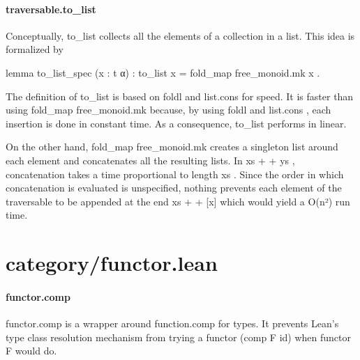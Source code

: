 \documentclass{article}
\begin{document}
\paragraph{traversable.to\_list}
\par
Conceptually, 
\colorbox[RGB]{253,246,227}{{{{\color[RGB]{101, 123, 131} to\_list }}}} collects all the elements of a collection
in a list. This idea is formalized by
\par
\colorbox[RGB]{253,246,227}{{{{\color[RGB]{133, 153, 0} lemma }}}{{{\color[RGB]{101, 123, 131}   }}}{{{\color[RGB]{211, 54, 130} to\_list\_spec }}}{{{\color[RGB]{101, 123, 131}   }}}{{{\color[RGB]{101, 123, 131} (x : t α) : to\_list x  }}}{{{\color[RGB]{181, 137, 0} = }}}{{{\color[RGB]{101, 123, 131}  fold\_map free\_monoid.mk x }}}}.
\par
The definition of 
\colorbox[RGB]{253,246,227}{{{{\color[RGB]{101, 123, 131} to\_list }}}} is based on 
\colorbox[RGB]{253,246,227}{{{{\color[RGB]{101, 123, 131} foldl }}}} and 
\colorbox[RGB]{253,246,227}{{{{\color[RGB]{101, 123, 131} list.cons }}}} for
speed. It is faster than using 
\colorbox[RGB]{253,246,227}{{{{\color[RGB]{101, 123, 131} fold\_map free\_monoid.mk }}}} because, by
using 
\colorbox[RGB]{253,246,227}{{{{\color[RGB]{101, 123, 131} foldl }}}} and 
\colorbox[RGB]{253,246,227}{{{{\color[RGB]{101, 123, 131} list.cons }}}}, each insertion is done in constant
time. As a consequence, 
\colorbox[RGB]{253,246,227}{{{{\color[RGB]{101, 123, 131} to\_list }}}} performs in linear.
\par
On the other hand, 
\colorbox[RGB]{253,246,227}{{{{\color[RGB]{101, 123, 131} fold\_map free\_monoid.mk }}}} creates a singleton list
around each element and concatenates all the resulting lists. In
\colorbox[RGB]{253,246,227}{{{{\color[RGB]{101, 123, 131} xs  }}}{{{\color[RGB]{181, 137, 0} + }}}{{{\color[RGB]{181, 137, 0} + }}}{{{\color[RGB]{101, 123, 131}  ys }}}}, concatenation takes a time proportional to 
\colorbox[RGB]{253,246,227}{{{{\color[RGB]{101, 123, 131} length xs }}}}. Since
the order in which concatenation is evaluated is unspecified, nothing
prevents each element of the traversable to be appended at the end
\colorbox[RGB]{253,246,227}{{{{\color[RGB]{101, 123, 131} xs  }}}{{{\color[RGB]{181, 137, 0} + }}}{{{\color[RGB]{181, 137, 0} + }}}{{{\color[RGB]{101, 123, 131}  {[}x{]} }}}} which would yield a 
\colorbox[RGB]{253,246,227}{{{{\color[RGB]{101, 123, 131} O(n²) }}}} run time.
\section{category/functor.lean}\paragraph{functor.comp}
\par
\colorbox[RGB]{253,246,227}{{{{\color[RGB]{101, 123, 131} functor.comp }}}} is a wrapper around 
\colorbox[RGB]{253,246,227}{{{{\color[RGB]{101, 123, 131} function.comp }}}} for types.
It prevents Lean's type class resolution mechanism from trying
a 
\colorbox[RGB]{253,246,227}{{{{\color[RGB]{101, 123, 131} functor (comp F id) }}}} when 
\colorbox[RGB]{253,246,227}{{{{\color[RGB]{101, 123, 131} functor F }}}} would do.
\end{document}
